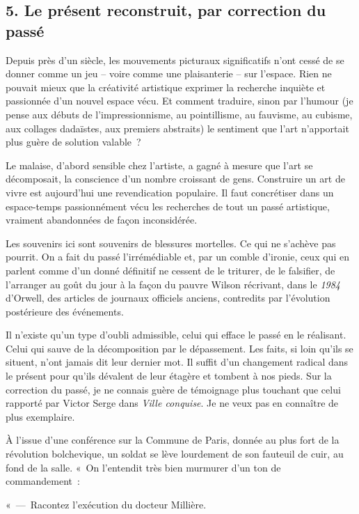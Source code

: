 \documentclass[french,twoside]{book} %
\begin{document}
\subsection[{5. Le présent reconstruit, par correction du passé}]{\textsc{5.} Le présent reconstruit, par correction du passé}
\noindent Depuis près d’un siècle, les mouvements picturaux significatifs n’ont cessé de se donner comme un jeu – voire comme une plaisanterie – sur l’espace. Rien ne pouvait mieux que la créativité artistique exprimer la recherche inquiète et passionnée d’un nouvel espace vécu. Et comment traduire, sinon par l’humour (je pense aux débuts de l’impressionnisme, au pointillisme, au fauvisme, au cubisme, aux collages dadaïstes, aux premiers abstraits) le sentiment que l’art n’apportait plus guère de solution valable ?\par
Le malaise, d’abord sensible chez l’artiste, a gagné à mesure que l’art se décomposait, la conscience d’un nombre croissant de gens. Construire un art de vivre est aujourd’hui une revendication populaire. Il faut concrétiser dans un espace-temps passionnément vécu les recherches de tout un passé artistique, vraiment abandonnées de façon inconsidérée.\par
Les souvenirs ici sont souvenirs de blessures mortelles. Ce qui ne s’achève pas pourrit. On a fait du passé l’irrémédiable et, par un comble d’ironie, ceux qui en parlent comme d’un donné définitif ne cessent de le triturer, de le falsifier, de l’arranger au goût du jour à la façon du pauvre Wilson récrivant, dans le \emph{1984} d’Orwell, des articles de journaux officiels anciens, contredits par l’évolution postérieure des événements.\par
Il n’existe qu’un type d’oubli admissible, celui qui efface le passé en le réalisant. Celui qui sauve de la décomposition par le dépassement. Les faits, si loin qu’ils se situent, n’ont jamais dit leur dernier mot. Il suffit d’un changement radical dans le présent pour qu’ils dévalent de leur étagère et tombent à nos pieds. Sur la correction du passé, je ne connais guère de témoignage plus touchant que celui rapporté par Victor Serge dans \emph{Ville conquise}. Je ne veux pas en connaître de plus exemplaire.\par
À l’issue d’une conférence sur la Commune de Paris, donnée au plus fort de la révolution bolchevique, un soldat se lève lourdement de son fauteuil de cuir, au fond de la salle. « On l’entendit très bien murmurer d’un ton de commandement :\par
« — Racontez l’exécution du docteur Millière.\par
\end{document}
